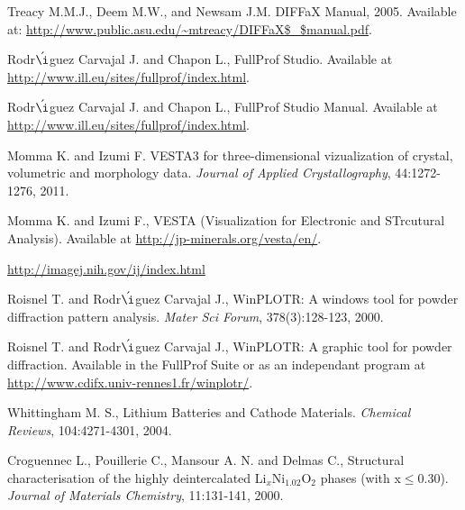 \begin{thebibliography}{99}
 Treacy M.M.J., Deem M.W., and Newsam J.M. DIFFaX Manual, 2005. Available at: \url{http://www.public.asu.edu/~mtreacy/DIFFaX$\_$manual.pdf}. 

 Rodr$\acute{\i}$guez Carvajal J. and Chapon L., FullProf Studio. Available at \url{http://www.ill.eu/sites/fullprof/index.html}.

 Rodr$\acute{\i}$guez Carvajal J. and Chapon L., FullProf Studio Manual. Available at \url{http://www.ill.eu/sites/fullprof/index.html}.

 Momma K. and Izumi F. VESTA3 for three-dimensional vizualization of crystal, volumetric and morphology data. \textit{Journal of Applied Crystallography}, 44:1272-1276, 2011.

 Momma K. and Izumi F., VESTA (Visualization for Electronic and STrcutural Analysis). Available at \url{http://jp-minerals.org/vesta/en/}.

 \url{http://imagej.nih.gov/ij/index.html}

 Roisnel T. and Rodr$\acute{\i}$guez Carvajal J., WinPLOTR: A windows tool for powder diffraction pattern analysis. \textit{Mater Sci Forum}, 378(3):128-123, 2000.

 Roisnel T. and Rodr$\acute{\i}$guez Carvajal J., WinPLOTR: A graphic tool for powder diffraction. Available in the FullProf Suite or as an independant program at \url{http://www.cdifx.univ-rennes1.fr/winplotr/}.

 Whittingham M. S., Lithium Batteries and Cathode Materials. \textit{Chemical Reviews}, 104:4271-4301, 2004. 

 Croguennec L., Pouillerie C., Mansour A. N. and Delmas C., Structural characterisation of the highly deintercalated Li$_{x}$Ni$_{1.02}$O$_{2}$ phases (with x$\leq$0.30). \textit{Journal of Materials Chemistry}, 11:131-141, 2000.



\end{thebibliography}
